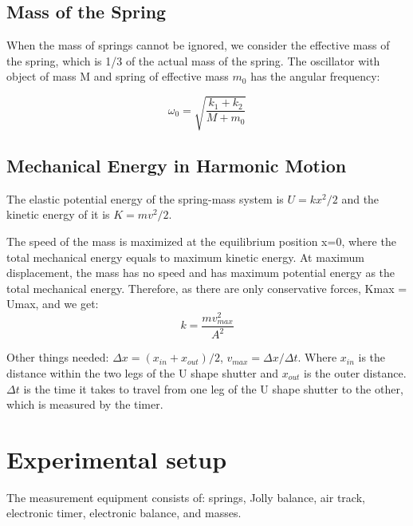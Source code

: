 \documentclass[12pt,a4paper]{article}
\begin{document}
\subsection{Mass of the Spring}
When the mass of springs cannot be ignored, we consider the effective mass of the spring, which is 1/3 of the actual mass of the spring. The oscillator with object of mass M and spring of effective mass $m_0$ has the angular frequency:

\begin{equation}
    \omega_0=\sqrt{\frac{k_1+k_2}{M+m_0}}
\end{equation}

\subsection{Mechanical Energy in Harmonic Motion}
The elastic potential energy of the spring-mass system is $U=kx^2/2$ and the kinetic energy of it is $K=mv^2/2$.\par 
The speed of the mass is maximized at the equilibrium position x=0, where the total mechanical energy equals to maximum kinetic energy. At maximum displacement, the mass has no speed and has maximum potential energy as the total mechanical energy. Therefore, as there are only conservative forces, Kmax = Umax, and we get:
\begin{equation}
    k=\frac{mv^2_{max}}{A^2}
\end{equation}

Other things needed: $\Delta x=(x_{in}+x_{out})/2$, $v_{max}=\Delta x/\Delta t$. Where $x_{in}$ is the distance within the two legs of the U shape shutter and $x_{out}$ is the outer distance. $\Delta t$ is the time it takes to travel from one leg of the U shape shutter to the other, which is measured by the timer.


\section{Experimental setup}
The measurement equipment consists of: springs, Jolly balance, air track, electronic timer, electronic balance, and masses.
\end{document}
